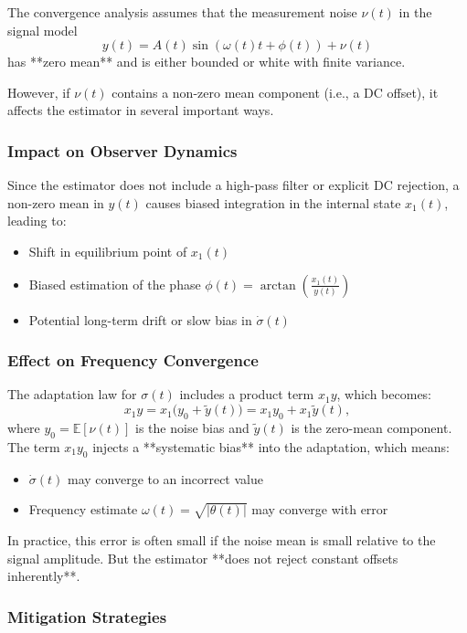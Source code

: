 \documentclass[11pt,letterpaper]{article}
\begin{document}
The convergence analysis assumes that the measurement noise \(\nu(t)\) in the signal model
\[
y(t) = A(t)\sin(\omega(t)t + \phi(t)) + \nu(t)
\]
has **zero mean** and is either bounded or white with finite variance.

However, if \(\nu(t)\) contains a non-zero mean component (i.e., a DC offset), it affects the estimator in several important ways.

\subsubsection*{Impact on Observer Dynamics}
Since the estimator does not include a high-pass filter or explicit DC rejection, a non-zero mean in \(y(t)\) causes biased integration in the internal state \(x_1(t)\), leading to:

\begin{itemize}
  \item Shift in equilibrium point of \(x_1(t)\)
  \item Biased estimation of the phase \(\phi(t) = \arctan\left(\frac{x_1(t)}{y(t)}\right)\)
  \item Potential long-term drift or slow bias in \(\dot{\sigma}(t)\)
\end{itemize}

\subsubsection*{Effect on Frequency Convergence}

The adaptation law for \(\sigma(t)\) includes a product term \(x_1 y\), which becomes:
\[
x_1 y = x_1 \bigl(y_0 + \tilde{y}(t)\bigr) = x_1 y_0 + x_1 \tilde{y}(t),
\]
where \(y_0 = \mathbb{E}[\nu(t)]\) is the noise bias and \(\tilde{y}(t)\) is the zero-mean component. The term \(x_1 y_0\) injects a **systematic bias** into the adaptation, which means:

\begin{itemize}
  \item \(\dot{\sigma}(t)\) may converge to an incorrect value
  \item Frequency estimate \(\omega(t) = \sqrt{|\theta(t)|}\) may converge with error
\end{itemize}

In practice, this error is often small if the noise mean is small relative to the signal amplitude. But the estimator **does not reject constant offsets inherently**.

\subsubsection*{Mitigation Strategies}
\end{document}
